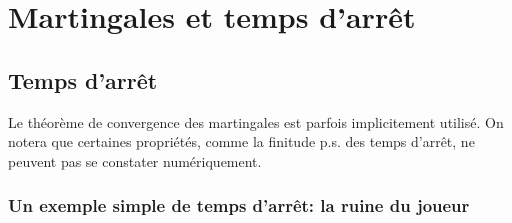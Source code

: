 {{%
\section{Martingales et temps d'arrêt}\label{se:martingales}
%

%
\subsection{Temps d'arrêt}
\label{ss:tda}
%

Le théorème de convergence des martingales est parfois implicitement utilisé.
On notera que certaines propriétés, comme la finitude p.s. des temps d'arrêt, 
ne peuvent pas se constater numériquement.

%
\subsubsection{Un exemple simple de temps d'arrêt: la ruine du joueur}
%

}}
